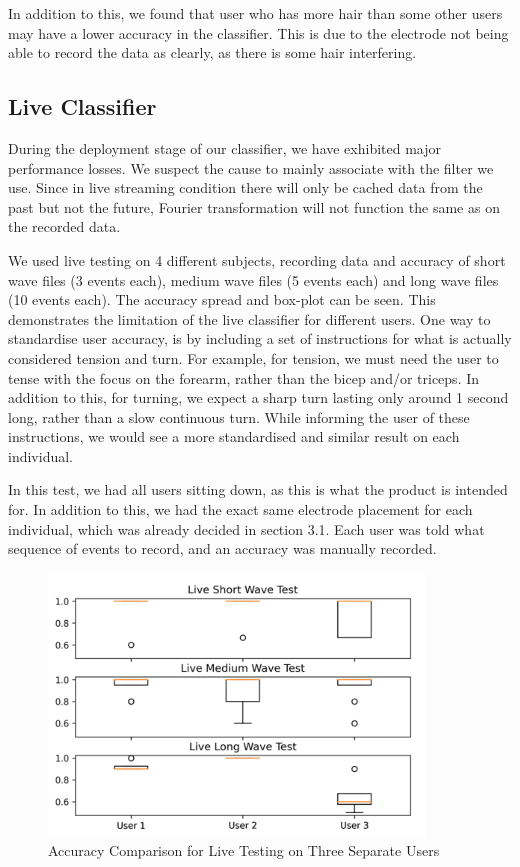 \documentclass[oneside]{article}
\begin{document}
In addition to this, we found that user who has more hair than some other users may have a lower accuracy in the classifier. This is due to the electrode not being able to record the data as clearly, as there is some hair interfering. 


\subsection{Live Classifier} 

During the deployment stage of our classifier, we have exhibited major performance losses. We suspect the cause to mainly associate with the filter we use. Since in live streaming condition there will only be cached data from the past but not the future, Fourier transformation will not function the same as on the recorded data.

We used live testing on 4 different subjects, recording data and accuracy of short wave files (3 events each), medium wave files (5 events each) and long wave files (10 events each). The accuracy spread and box-plot can be seen. This demonstrates the limitation of the live classifier for different users. One way to standardise user accuracy, is by including a set of instructions for what is actually considered tension and turn. For example, for tension, we must need the user to tense with the focus on the forearm, rather than the bicep and/or triceps. In addition to this, for turning, we expect a sharp turn lasting only around 1 second long, rather than a slow continuous turn. While informing the user of these instructions, we would see a more standardised and similar result on each individual. 

In this test, we had all users sitting down, as this is what the product is intended for. In addition to this, we had the exact same electrode placement for each individual, which was already decided in section 3.1. Each user was told what sequence of events to record, and an accuracy was manually recorded.

\begin{figure}[H]
  \centering
  \includegraphics[width = 10cm]{Pictures/livetest.png}
  \caption{Accuracy Comparison for Live Testing on Three Separate Users}
  \end{figure}
\end{document}
